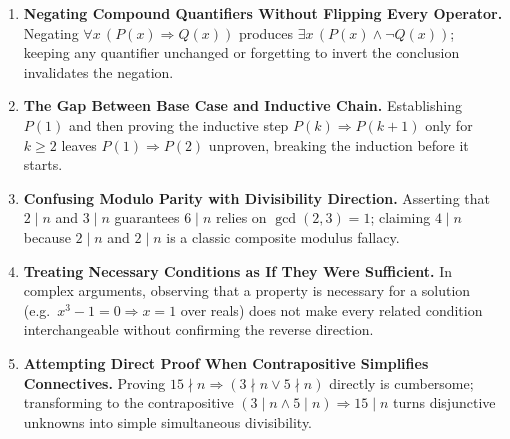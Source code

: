 \documentclass[11pt,a4paper]{article}
\begin{document}
\begin{enumerate}[leftmargin=2em, itemsep=4pt]
  \item \textbf{Negating Compound Quantifiers Without Flipping Every Operator.}
        Negating $\forall x\,(P(x)\Rightarrow Q(x))$ produces $\exists x\,(P(x)\land\neg Q(x))$; keeping any quantifier unchanged or forgetting to invert the conclusion invalidates the negation. 
  \item \textbf{The Gap Between Base Case and Inductive Chain.}
        Establishing $P(1)$ and then proving the inductive step $P(k)\Rightarrow P(k+1)$ only for $k\ge2$ leaves $P(1)\Rightarrow P(2)$ unproven, breaking the induction before it starts. 
  \item \textbf{Confusing Modulo Parity with Divisibility Direction.}
        Asserting that $2\mid n$ and $3\mid n$ guarantees $6\mid n$ relies on $\gcd(2,3)=1$; claiming $4\mid n$ because $2\mid n$ and $2\mid n$ is a classic composite modulus fallacy. 
  \item \textbf{Treating Necessary Conditions as If They Were Sufficient.}
        In complex arguments, observing that a property is necessary for a solution (e.g.\ $x^3-1=0\Rightarrow x=1$ over reals) does not make every related condition interchangeable without confirming the reverse direction. 
  \item \textbf{Attempting Direct Proof When Contrapositive Simplifies Connectives.}
        Proving $15\nmid n\Rightarrow(3\nmid n\lor 5\nmid n)$ directly is cumbersome; transforming to the contrapositive $(3\mid n\land 5\mid n)\Rightarrow15\mid n$ turns disjunctive unknowns into simple simultaneous divisibility. 
\end{enumerate}

\end{document}
